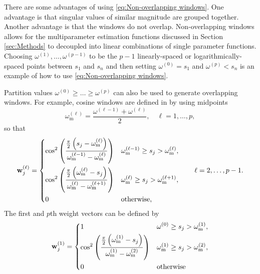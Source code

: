 \documentclass[12pt]{article}
\newcommand{\wVec}{\mathbf{w}}	%
\newcommand{\partition}{\omega}  %
\newcommand{\midpoint}{\partition_{\text{m}}}   %
\newcommand{\singular}{s}	%
\begin{document}
There are some advantages of using \eqref{eq:Non-overlapping windows}. One advantage is that singular values of similar magnitude are grouped together. Another advantage is that the windows do not overlap. Non-overlapping windows allows for the multiparameter estimation functions discussed in Section \ref{sec:Methods} to decoupled into linear combinations of single parameter functions. Choosing $\partition^{(1)},\ldots,\partition^{(p-1)}$ to be the $p-1$ linearly-spaced or logarithmically-spaced points between $\singular_1$ and $\singular_n$ and then setting $\partition^{(0)} = \singular_1$ and $\partition^{(p)} < \singular_n$ is an example of how to use \eqref{eq:Non-overlapping windows}. \par 
Partition values $\partition^{(0)} \geq \ldots \geq \partition^{(p)}$ can also be used to generate overlapping windows. For example, cosine windows are defined in \cite{ChungEasleyOLeary} by using midpoints
\begin{equation}
\label{eq:Midpoints}
    \midpoint^{(\ell)} = \frac{\partition^{(\ell-1)} + \partition^{(\ell)}}{2}, \quad \ell = 1,\ldots,p,
\end{equation}
so that
\begin{equation}
\label{eq:Middle cosine windows}
    \wVec_j^{(\ell)} = \begin{dcases}
    \cos^2\left(\frac{\frac{\pi}{2}\left(\singular_j - \midpoint^{(\ell)}\right)}{\midpoint^{(\ell-1)} - \midpoint^{(\ell)}}\right) & \midpoint^{(\ell-1)} \geq \singular_j > \midpoint^{(\ell)}, \\
    \cos^2\left(\frac{\frac{\pi}{2}\left(\midpoint^{(\ell)} - \singular_j\right)}{\midpoint^{(\ell)} - \midpoint^{(\ell+1)}}\right) & \midpoint^{(\ell)} \geq \singular_j > \midpoint^{(\ell+1)}, \\
    0 & \text{otherwise,}
    \end{dcases} \qquad \ell = 2,\ldots,p-1.
\end{equation}
The first and $p$th weight vectors can be defined by 
\begin{equation}
\label{eq:First cosine window}
     \wVec_j^{(1)} = \begin{dcases}
    1 & \omega^{(0)} \geq \singular_j > \midpoint^{(1)}, \\
    \cos^2\left(\frac{\frac{\pi}{2}\left(\midpoint^{(1)} - \singular_j\right)}{\midpoint^{(1)} - \midpoint^{(2)}}\right) & \midpoint^{(1)} \geq \singular_j > \midpoint^{(2)}, \\
    0 & \text{otherwise}
    \end{dcases}
\end{equation}
\end{document}
